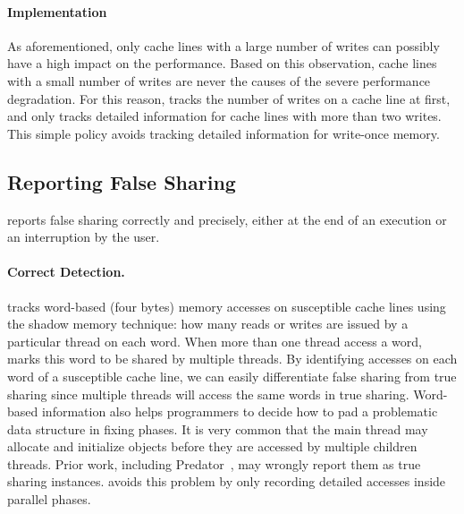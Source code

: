 
\paragraph{Implementation} 
As aforementioned, only cache lines with a large number of writes can possibly have a high impact on the performance. Based on this observation, cache lines with a small number of writes are never the causes of the severe performance degradation. For this reason, \Cheetah{} tracks the number of writes on a cache line at first, and only tracks detailed information for cache lines with more than two writes. This simple policy avoids tracking detailed information for write-once memory. 

 \subsection{Reporting False Sharing}
\label{sec:report}

\Cheetah{} reports false sharing correctly and precisely, either at the end of an execution or an interruption by the user.  

\paragraph{Correct Detection.} \Cheetah{} tracks word-based (four bytes) memory accesses on susceptible cache lines using the shadow memory technique: how many reads or writes are issued by a particular thread on each word. When more than one thread access a word, \Cheetah{} marks this word to be shared by multiple threads. By identifying accesses on each word of a susceptible cache line, we can easily differentiate false sharing from true sharing since multiple threads will access the same words in true sharing. Word-based information also helps programmers to decide how to pad a problematic data structure in fixing phases. It is very common that the main thread may allocate and initialize objects before they are accessed by multiple children threads. Prior work, including Predator~\cite{Predator}, may wrongly report them as true sharing instances. \cheetah{} avoids this problem by only recording detailed accesses inside parallel phases.

